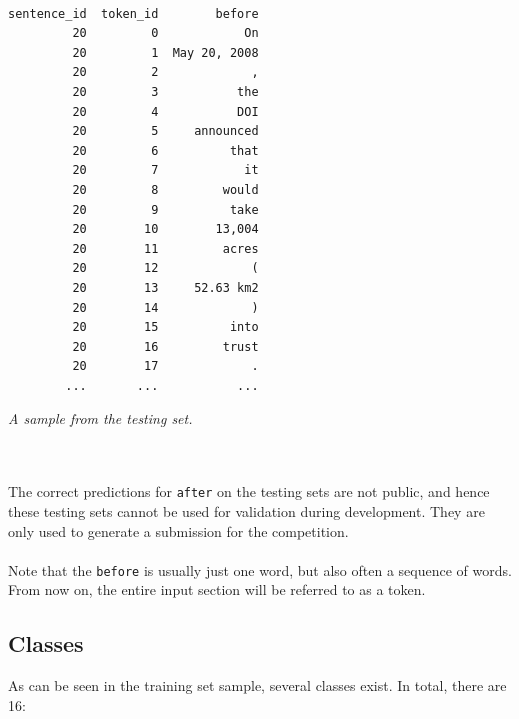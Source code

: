 \documentclass[a4paper, 9pt]{extarticle}
\newcommand{\code}{\texttt}
\begin{document}
\quad\quad\quad\quad\quad\quad\quad\quad\quad\
\begin{minipage}[t]{0.5\textwidth}
\begin{lstlisting}[linewidth=15em]
sentence_id  token_id        before
         20         0            On
         20         1  May 20, 2008
         20         2             ,
         20         3           the
         20         4           DOI
         20         5     announced
         20         6          that
         20         7            it
         20         8         would
         20         9          take
         20        10        13,004
         20        11         acres
         20        12             (
         20        13     52.63 km2
         20        14             )
         20        15          into
         20        16         trust
         20        17             .
        ...       ...           ...
\end{lstlisting}
\textit{A sample from the testing set.}
\end{minipage}\\
\\
The correct predictions for \code{after} on the testing sets are not public, and hence these testing sets cannot be used for validation during development. They are only used to generate a submission for the competition.\\\\
Note that the \code{before} is usually just one word, but also often a sequence of words. From now on, the entire input section will be referred to as a token.

\subsection{Classes}
\label{DataClasses}
As can be seen in the training set sample, several classes exist. In total, there are 16:\\
\end{document}
